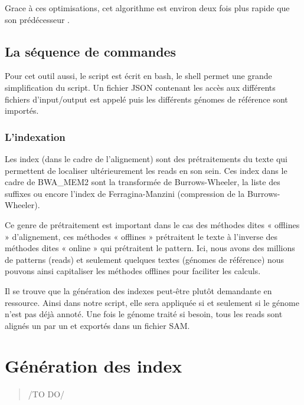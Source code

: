 \noindent Grace à ces optimisations, cet algorithme est environ deux fois plus rapide que son prédécesseur \cite{bwamem2, BWAimproved}.

\subsection*{La séquence de commandes}
Pour cet outil aussi, le script est écrit en bash, le shell permet une grande simplification du script. Un fichier JSON contenant les accès aux différents fichiers d’input/output est appelé puis les différents génomes de référence sont importés. 

\subsubsection*{L’indexation}
Les index (dans le cadre de l’alignement) sont des prétraitements du texte qui permettent de localiser ultérieurement les reads en son sein. Ces index dans le cadre de BWA\_MEM2 sont la transformée de Burrows-Wheeler, la liste des suffixes ou encore l’index de Ferragina-Manzini (compression de la Burrows-Wheeler).

Ce genre de prétraitement est important dans le cas des méthodes dites « offlines » d’alignement, ces méthodes « offlines » prétraitent le texte à l’inverse des méthodes dites « online » qui prétraitent le pattern. Ici, nous avons des millions de patterns (reads) et seulement quelques textes (génomes de référence) nous pouvons ainsi capitaliser les méthodes offlines pour faciliter les calculs. 

Il se trouve que la génération des indexes peut-être plutôt demandante en ressource. Ainsi dans notre script, elle sera appliquée si et seulement si le génome n’est pas déjà annoté. 
Une fois le génome traité si besoin, tous les reads sont alignés un par un et exportés dans un fichier SAM.
 
\section{Génération des index}


\begin{quote}
    /TO DO/
\end{quote}


